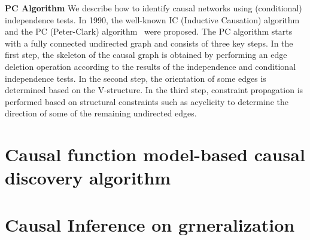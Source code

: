 \documentclass{article}
\begin{document}
\textbf{PC Algorithm} We describe how to identify causal networks using (conditional) independence tests. In 1990, the well-known IC (Inductive Causation) algorithm~\citep{spirtes2000causation} and the PC (Peter-Clark) algorithm~\citep{spirtes1991algorithm} were proposed. The PC algorithm starts with a fully connected undirected graph and consists of three key steps. In the first step, the skeleton of the causal graph is obtained by performing an edge deletion operation according to the results of the independence and conditional independence tests. In the second step, the orientation of some edges is determined based on the V-structure. In the third step, constraint propagation is performed based on structural constraints such as acyclicity to determine the direction of some of the remaining undirected edges.
\section{Causal function model-based causal discovery algorithm}


\section{Causal Inference on grneralization}

\end{document}
